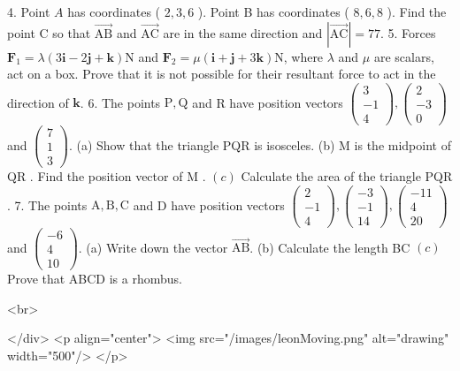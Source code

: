4. Point $A$ has coordinates ( $2,3,6$ ). Point B has coordinates ( $8,6,8$ ). Find the point C so that $\overrightarrow{\mathrm{AB}}$ and $\overrightarrow{\mathrm{AC}}$ are in the same direction and $|\overrightarrow{\mathrm{AC}}|=77$.
5. Forces $\mathbf{F}_{1}=\lambda(3 \mathbf{i}-2 \mathbf{j}+\mathbf{k}) \mathrm{N}$ and $\mathbf{F}_{2}=\mu(\mathbf{i}+\mathbf{j}+3 \mathbf{k}) \mathrm{N}$, where $\lambda$ and $\mu$ are scalars, act on a box. Prove that it is not possible for their resultant force to act in the direction of $\mathbf{k}$.
6. The points $\mathrm{P}, \mathrm{Q}$ and R have position vectors $\left(\begin{array}{c}3 \\ -1 \\ 4\end{array}\right),\left(\begin{array}{c}2 \\ -3 \\ 0\end{array}\right)$ and $\left(\begin{array}{l}7 \\ 1 \\ 3\end{array}\right)$.
(a) Show that the triangle PQR is isosceles.
(b) M is the midpoint of QR . Find the position vector of M .
\((c)\) Calculate the area of the triangle PQR .
7. The points $\mathrm{A}, \mathrm{B}, \mathrm{C}$ and D have position vectors $\left(\begin{array}{c}2 \\ -1 \\ 4\end{array}\right),\left(\begin{array}{l}-3 \\ -1 \\ 14\end{array}\right),\left(\begin{array}{c}-11 \\ 4 \\ 20\end{array}\right)$ and $\left(\begin{array}{c}-6 \\ 4 \\ 10\end{array}\right)$.
(a) Write down the vector $\overrightarrow{\mathrm{AB}}$.
(b) Calculate the length BC
\((c)\) Prove that ABCD is a rhombus.

<br>

</div>
<p align="center">
<img src="/images/leonMoving.png" alt="drawing" width="500"/>
</p>
